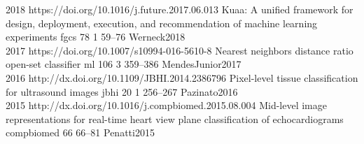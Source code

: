 \begin{publications}
  {
  }
  {2018}
  {https://doi.org/10.1016/j.future.2017.06.013}
  {Kuaa: A unified framework for design, deployment, execution, and recommendation of machine learning experiments}
  {fgcs}
  {78}
  {1}
  {59--76}
  {Werneck2018}
  \\

  {
  }
  {2017}
  {https://doi.org/10.1007/s10994-016-5610-8}
  {Nearest neighbors distance ratio open-set classifier}
  {ml}
  {106}
  {3}
  {359--386}
  {MendesJunior2017}
  \\

  {
  }
  {2016}
  {http://dx.doi.org/10.1109/JBHI.2014.2386796}
  {Pixel-level tissue classification for ultrasound images}
  {jbhi}
  {20}
  {1}
  {256--267}
  {Pazinato2016}
  \\

  {
  }
  {2015}
  {http://dx.doi.org/10.1016/j.compbiomed.2015.08.004}
  {Mid-level image representations for real-time heart view plane classification of echocardiograms}
  {compbiomed}
  {66}
  {}
  {66--81}
  {Penatti2015}
  \\

\end{publications}

